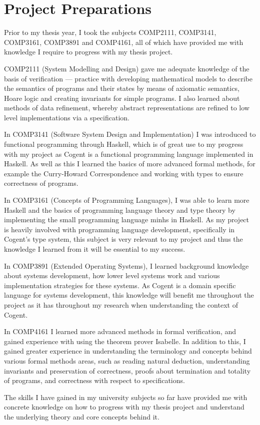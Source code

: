 \chapter{Project Preparations}\label{ch:preperation}

Prior to my thesis year, I took the subjects COMP2111, COMP3141, COMP3161, COMP3891 and COMP4161,
all of which have provided me with knowledge I require to progress with my thesis project.

COMP2111 (System Modelling and Design) gave me adequate knowledge of the basis of verification 
--- practice with developing
mathematical models to describe the semantics of programs and their states by means of 
axiomatic semantics, Hoare logic and creating invariants for simple programs. I also 
learned about methods of data refinement, whereby abstract representations are refined to low
level implementations via a specification.

In COMP3141 (Software System Design and Implementation) I was introduced to functional 
programming through Haskell, which is of great
use to my progress with my project as Cogent is a functional programming language implemented in Haskell.
As well as this I learned the basics of more advanced formal methods, for example the Curry-Howard
Correspondence and working with types to ensure correctness of programs.

In COMP3161 (Concepts of Programming Languages), I was able to learn more Haskell and the
basics of programming language theory and type theory by implementing the small programming 
language minhs in Haskell. As my project is heavily involved with programming language development,
specifically in Cogent's type system, this subject is very relevant to my project and thus the knowledge
I learned from it will be essential to my success.

In COMP3891 (Extended Operating Systems), I learned background knowledge about systems development,
how lower level systems work and various implementation strategies for these systems. As Cogent
is a domain specific language for systems development, this knowledge will benefit me throughout
the project as it has throughout my research when understanding the context of Cogent.

In COMP4161 I learned more advanced methods in formal verification, and gained experience with using
the theorem prover Isabelle. In addition to this, I gained greater experience in understanding the 
terminology and concepts behind various formal methods areas, such as reading natural deduction,
understanding invariants and preservation of correctness, proofs about termination and totality
of programs, and correctness with respect to specifications.

The skills I have gained in my university subjects so far have provided me with concrete knowledge on
how to progress with my thesis project and understand the underlying theory and core concepts behind
it.